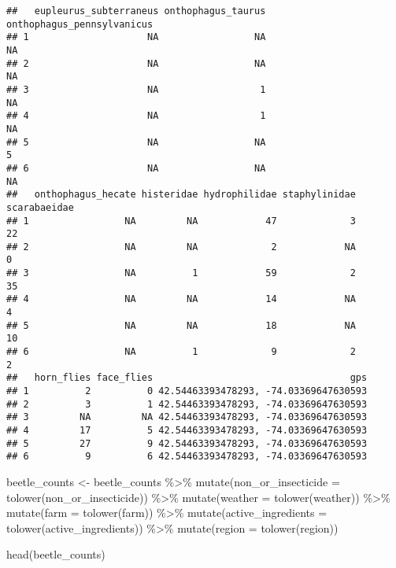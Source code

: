 \documentclass[
]{article}
\newenvironment{Shaded}{\begin{snugshade}}{\end{snugshade}}
\newcommand{\AttributeTok}[1]{\textcolor[rgb]{0.77,0.63,0.00}{#1}}
\newcommand{\FunctionTok}[1]{\textcolor[rgb]{0.00,0.00,0.00}{#1}}
\newcommand{\NormalTok}[1]{#1}
\newcommand{\OtherTok}[1]{\textcolor[rgb]{0.56,0.35,0.01}{#1}}
\newcommand{\SpecialCharTok}[1]{\textcolor[rgb]{0.00,0.00,0.00}{#1}}
\begin{document}
\begin{verbatim}
##   eupleurus_subterraneus onthophagus_taurus onthophagus_pennsylvanicus
## 1                     NA                 NA                         NA
## 2                     NA                 NA                         NA
## 3                     NA                  1                         NA
## 4                     NA                  1                         NA
## 5                     NA                 NA                          5
## 6                     NA                 NA                         NA
##   onthophagus_hecate histeridae hydrophilidae staphylinidae scarabaeidae
## 1                 NA         NA            47             3           22
## 2                 NA         NA             2            NA            0
## 3                 NA          1            59             2           35
## 4                 NA         NA            14            NA            4
## 5                 NA         NA            18            NA           10
## 6                 NA          1             9             2            2
##   horn_flies face_flies                                   gps
## 1          2          0 42.54463393478293, -74.03369647630593
## 2          3          1 42.54463393478293, -74.03369647630593
## 3         NA         NA 42.54463393478293, -74.03369647630593
## 4         17          5 42.54463393478293, -74.03369647630593
## 5         27          9 42.54463393478293, -74.03369647630593
## 6          9          6 42.54463393478293, -74.03369647630593
\end{verbatim}

\begin{Shaded}
\begin{Highlighting}[]
\NormalTok{beetle\_counts }\OtherTok{\textless{}{-}}\NormalTok{ beetle\_counts }\SpecialCharTok{\%\textgreater{}\%}
  \FunctionTok{mutate}\NormalTok{(}\AttributeTok{non\_or\_insecticide =} \FunctionTok{tolower}\NormalTok{(non\_or\_insecticide)) }\SpecialCharTok{\%\textgreater{}\%}
  \FunctionTok{mutate}\NormalTok{(}\AttributeTok{weather =} \FunctionTok{tolower}\NormalTok{(weather)) }\SpecialCharTok{\%\textgreater{}\%}
  \FunctionTok{mutate}\NormalTok{(}\AttributeTok{farm =} \FunctionTok{tolower}\NormalTok{(farm)) }\SpecialCharTok{\%\textgreater{}\%}
  \FunctionTok{mutate}\NormalTok{(}\AttributeTok{active\_ingredients =} \FunctionTok{tolower}\NormalTok{(active\_ingredients)) }\SpecialCharTok{\%\textgreater{}\%}
  \FunctionTok{mutate}\NormalTok{(}\AttributeTok{region =} \FunctionTok{tolower}\NormalTok{(region)) }

\FunctionTok{head}\NormalTok{(beetle\_counts)}
\end{Highlighting}
\end{Shaded}
\end{document}
